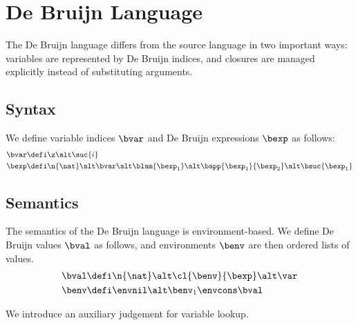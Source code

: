 \section*{De Bruijn Language}

The De Bruijn language differs from the source language in two important ways: variables are represented by De Bruijn indices, and closures are managed explicitly instead of substituting arguments.



\ensurecommand{\blam}{\lam{}}
\ensurecommand{\bapp}{\app}
\ensurecommand{\bsuc}{\hsuc}

\subsection*{Syntax}

We define variable indices $\bvar$ and De Bruijn expressions $\bexp$ as follows:
\begin{align*}
	\bvar &\defi \z \alt \suc{i} \\
	\bexp &\defi \n{\nat} \alt \bvar \alt \blam{\bexp_1} \alt \bapp{\bexp_1}{\bexp_2} \alt \bsuc{\bexp_1} \\
\end{align*}

\subsection*{Semantics}

\ensurecommand{\benv}{\alpha}

The semantics of the De Bruijn language is environment-based.
We define De Bruijn values $\bval$ as follows, and environments $\benv$ are then ordered lists of values.
\begin{align*}
  \bval &\defi \n{\nat} \alt \cl{\benv}{\bexp} \alt \var \\
  \benv &\defi \envnil \alt \benv_1 \envcons \bval \\
\end{align*}


We introduce an auxiliary judgement for variable lookup.

\vspace{0.5cm}

